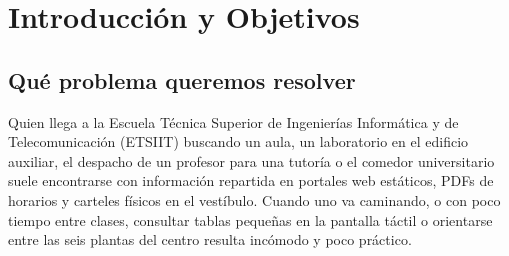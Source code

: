 \documentclass[11pt,a4paper]{article}
\begin{document}

\begin{abstract}
\noindent En esta memoria recogemos el diseño, la organización del equipo y el funcionamiento técnico de \textbf{PuntoInfo ETSIIT}, la aplicación Android que hemos desarrollado para la primera entrega de \textit{Nuevos Paradigmas de Interacción}. El proyecto convierte el típico punto de información fijo del vestíbulo de la escuela en un asistente móvil que acompaña al estudiante tanto por el exterior del Campus de Aynadamar como por el interior de la ETSIIT, apostando por la interacción natural mediante gestos físicos, voz, sensores del teléfono y controles táctiles claros.

A lo largo del documento explicamos cómo hemos repartido el trabajo entre los cinco integrantes del grupo, por qué elegimos Kotlin y Jetpack Compose, qué sensores de categorías distintas utilizamos (movimiento, presión atmosférica, proximidad, GPS, cámara, biometría y audio/voz) y cómo resolvemos problemas prácticos reales: evitar gestos accidentales en mano, deducir el punto de partida dentro de un edificio sin GPS vertical, alternar automáticamente entre el plano 2D y fotografías reales guiadas al levantar el teléfono, reservar el menú para llevar del comedor mediante confirmación biométrica y ofrecer toda la interfaz en español e inglés y con rutas accesibles por ascensor.
\end{abstract}

\vspace{0.1cm}
{\small
\setlength{\parskip}{0pt}
\tableofcontents
}
\newpage
{}

\section{Introducción y Objetivos}

\subsection{Qué problema queremos resolver}
Quien llega a la Escuela Técnica Superior de Ingenierías Informática y de Telecomunicación (ETSIIT) buscando un aula, un laboratorio en el edificio auxiliar, el despacho de un profesor para una tutoría o el comedor universitario suele encontrarse con información repartida en portales web estáticos, PDFs de horarios y carteles físicos en el vestíbulo. Cuando uno va caminando, o con poco tiempo entre clases, consultar tablas pequeñas en la pantalla táctil o orientarse entre las seis plantas del centro resulta incómodo y poco práctico.
\end{document}
